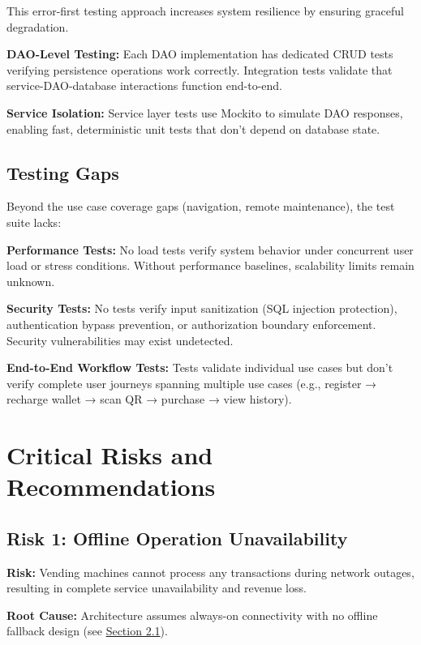 \documentclass[11pt,a4paper]{article}
\begin{document}
This error-first testing approach increases system resilience by ensuring graceful degradation.

\textbf{DAO-Level Testing:} Each DAO implementation has dedicated CRUD tests verifying persistence operations work correctly. Integration tests validate that service-DAO-database interactions function end-to-end.

\textbf{Service Isolation:} Service layer tests use Mockito to simulate DAO responses, enabling fast, deterministic unit tests that don't depend on database state.

\subsection{Testing Gaps}

Beyond the use case coverage gaps (navigation, remote maintenance), the test suite lacks:

\textbf{Performance Tests:} No load tests verify system behavior under concurrent user load or stress conditions. Without performance baselines, scalability limits remain unknown.

\textbf{Security Tests:} No tests verify input sanitization (SQL injection protection), authentication bypass prevention, or authorization boundary enforcement. Security vulnerabilities may exist undetected.

\textbf{End-to-End Workflow Tests:} Tests validate individual use cases but don't verify complete user journeys spanning multiple use cases (e.g., register → recharge wallet → scan QR → purchase → view history).

\section{Critical Risks and Recommendations}

\subsection{Risk 1: Offline Operation Unavailability}
\label{risk:offline}

\textbf{Risk:} Vending machines cannot process any transactions during network outages, resulting in complete service unavailability and revenue loss.

\textbf{Root Cause:} Architecture assumes always-on connectivity with no offline fallback design (see \hyperref[sec:offline-gap]{Section 2.1}).
\end{document}
